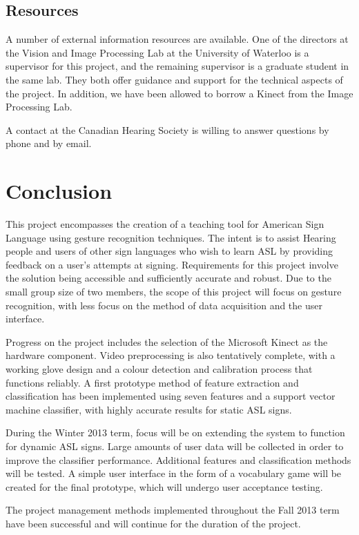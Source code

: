 \documentclass[12pt]{article}
\begin{document}
\subsection{Resources}
A number of external information resources are available. One of the directors at the Vision and Image Processing Lab at the University of Waterloo is a supervisor for this project, and the remaining supervisor is a graduate student in the same lab. They both offer guidance and support for the technical aspects of the project. In addition, we have been allowed to borrow a Kinect from the Image Processing Lab.

A contact at the Canadian Hearing Society is willing to answer questions by phone and by email.

\newpage
\section{Conclusion}
This project encompasses the creation of a teaching tool for American Sign Language using gesture recognition techniques. The intent is to assist Hearing people and users of other sign languages who wish to learn ASL by providing feedback on a user’s attempts at signing. Requirements for this project involve the solution being accessible and sufficiently accurate and robust. Due to the small group size of two members, the scope of this project will focus on gesture recognition, with less focus on the method of data acquisition and the user interface.

Progress on the project includes the selection of the Microsoft Kinect as the hardware component. Video preprocessing is also tentatively complete, with a working glove design and a colour detection and calibration process that functions reliably. A first prototype method of feature extraction and classification has been implemented using seven features and a support vector machine classifier, with highly accurate results for static ASL signs.  

During the Winter 2013 term, focus will be on extending the system to function for dynamic ASL signs. Large amounts of user data will be collected in order to improve the classifier performance. Additional features and classification methods will be tested. A simple user interface in the form of a vocabulary game will be created for the final prototype, which will undergo user acceptance testing.

The project management methods implemented throughout the Fall 2013 term have been successful and will continue for the duration of the project. 

\newpage
\onehalfspacing
{}





\newpage
{}

\newpage
{}
\end{document}
